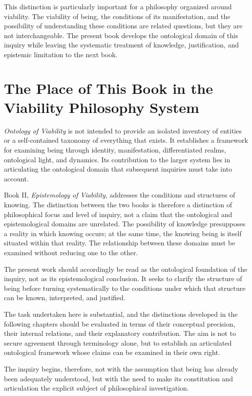 This distinction is particularly important for a philosophy
organized around viability. The viability of being, the
conditions of its manifestation, and the possibility of
understanding these conditions are related questions, but
they are not interchangeable. The present book develops the
ontological domain of this inquiry while leaving the systematic
treatment of knowledge, justification, and epistemic limitation
to the next book.

\section*{The Place of This Book in the Viability Philosophy System}

\textit{Ontology of Viability} is not intended to provide an
isolated inventory of entities or a self-contained taxonomy
of everything that exists. It establishes a framework for
examining being through identity, manifestation, differentiated
realms, ontological light, and dynamics. Its contribution to
the larger system lies in articulating the ontological domain
that subsequent inquiries must take into account.

Book II, \textit{Epistemology of Viability}, addresses the
conditions and structures of knowing. The distinction between
the two books is therefore a distinction of philosophical
focus and level of inquiry, not a claim that the ontological
and epistemological domains are unrelated. The possibility
of knowledge presupposes a reality in which knowing occurs;
at the same time, the knowing being is itself situated within
that reality. The relationship between these domains must
be examined without reducing one to the other.

The present work should accordingly be read as the ontological
foundation of the inquiry, not as its epistemological conclusion.
It seeks to clarify the structure of being before turning
systematically to the conditions under which that structure
can be known, interpreted, and justified.

The task undertaken here is substantial, and the distinctions
developed in the following chapters should be evaluated in
terms of their conceptual precision, their internal relations,
and their explanatory contribution. The aim is not to secure
agreement through terminology alone, but to establish an
articulated ontological framework whose claims can be examined
in their own right.

The inquiry begins, therefore, not with the assumption that
being has already been adequately understood, but with the
need to make its constitution and articulation the explicit
subject of philosophical investigation.

\cleardoublepage

